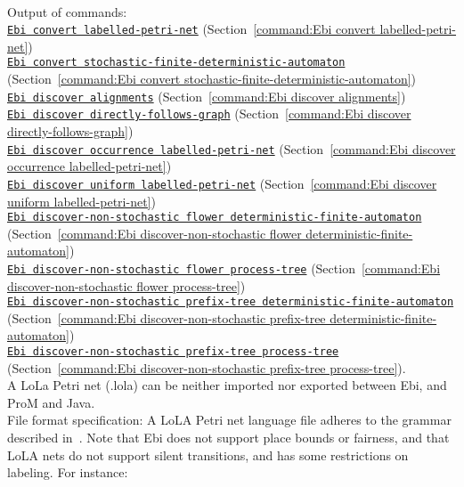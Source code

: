 {\\Output of commands: \\\null\qquad\hyperref[command:Ebi convert labelled-petri-net]{\texttt{Ebi convert labelled-petri-net}} (Section~\ref{command:Ebi convert labelled-petri-net})\\\null\qquad\hyperref[command:Ebi convert stochastic-finite-deterministic-automaton]{\texttt{Ebi convert stochastic-finite-deterministic-automaton}} (Section~\ref{command:Ebi convert stochastic-finite-deterministic-automaton})\\\null\qquad\hyperref[command:Ebi discover alignments]{\texttt{Ebi discover alignments}} (Section~\ref{command:Ebi discover alignments})\\\null\qquad\hyperref[command:Ebi discover directly-follows-graph]{\texttt{Ebi discover directly-follows-graph}} (Section~\ref{command:Ebi discover directly-follows-graph})\\\null\qquad\hyperref[command:Ebi discover occurrence labelled-petri-net]{\texttt{Ebi discover occurrence labelled-petri-net}} (Section~\ref{command:Ebi discover occurrence labelled-petri-net})\\\null\qquad\hyperref[command:Ebi discover uniform labelled-petri-net]{\texttt{Ebi discover uniform labelled-petri-net}} (Section~\ref{command:Ebi discover uniform labelled-petri-net})\\\null\qquad\hyperref[command:Ebi discover-non-stochastic flower deterministic-finite-automaton]{\texttt{Ebi discover-non-stochastic flower deterministic-finite-automaton}} (Section~\ref{command:Ebi discover-non-stochastic flower deterministic-finite-automaton})\\\null\qquad\hyperref[command:Ebi discover-non-stochastic flower process-tree]{\texttt{Ebi discover-non-stochastic flower process-tree}} (Section~\ref{command:Ebi discover-non-stochastic flower process-tree})\\\null\qquad\hyperref[command:Ebi discover-non-stochastic prefix-tree deterministic-finite-automaton]{\texttt{Ebi discover-non-stochastic prefix-tree deterministic-finite-automaton}} (Section~\ref{command:Ebi discover-non-stochastic prefix-tree deterministic-finite-automaton})\\\null\qquad\hyperref[command:Ebi discover-non-stochastic prefix-tree process-tree]{\texttt{Ebi discover-non-stochastic prefix-tree process-tree}} (Section~\ref{command:Ebi discover-non-stochastic prefix-tree process-tree}).
\\A LoLa Petri net (.lola) can be neither imported nor exported between Ebi, and ProM and Java.
\\File format specification:
A LoLA Petri net language file adheres to the grammar described in~\cite{DBLP:conf/apn/Wolf18a}.
    Note that Ebi does not support place bounds or fairness, and that LoLA nets do not support silent transitions, and has some restrictions on labeling.
For instance:
    
\clearpage
}
